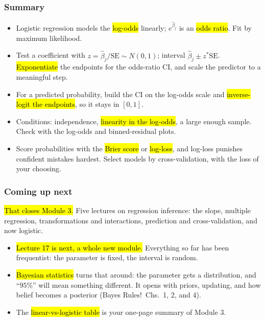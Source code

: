 \documentclass[slidestop,compress,mathserif]{beamer}
\begin{document}
\begin{frame}
\frametitle{Summary}

\begin{itemize}
\item Logistic regression models the \hl{log-odds} linearly; $e^{\hat\beta_j}$ is an \hl{odds ratio}. Fit by maximum likelihood.
\item Test a coefficient with $z = \hat\beta_j/\mathrm{SE} \sim N(0,1)$; interval $\hat\beta_j \pm z^\ast\mathrm{SE}$. \hl{Exponentiate} the endpoints for the odds-ratio CI, and scale the predictor to a meaningful step.
\item For a predicted probability, build the CI on the log-odds scale and \hl{inverse-logit the endpoints}, so it stays in $[0,1]$.
\item Conditions: independence, \hl{linearity in the log-odds}, a large enough sample. Check with the log-odds and binned-residual plots.
\item Score probabilities with the \hl{Brier score} or \hl{log-loss}, and log-loss punishes confident mistakes hardest. Select models by cross-validation, with the loss of your choosing.
\end{itemize}

\end{frame}


\begin{frame}
\frametitle{Coming up next}

\hl{That closes Module 3.} Five lectures on regression inference: the slope, multiple regression, transformations and interactions, prediction and cross-validation, and now logistic.

\vspace{0.4em}
\begin{itemize}
\item \hl{Lecture 17 is next, a whole new module.} Everything so far has been frequentist: the parameter is fixed, the interval is random.
\item \hl{Bayesian statistics} turns that around: the parameter gets a distribution, and ``$95\%$'' will mean something different. It opens with priors, updating, and how belief becomes a posterior (Bayes Rules!\ Chs.\ 1, 2, and 4).
\item The \hl{linear-vs-logistic table} is your one-page summary of Module 3.
\end{itemize}

\end{frame}
\end{document}
